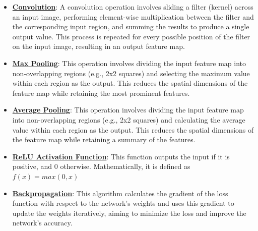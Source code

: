 \documentclass{article}%
\begin{document}
\begin{itemize}[leftmargin=*]%
\item \href{https://purdue.brightspace.com/d2l/common/assets/pdfjs-d2l-dist/1.0.14-legacy/web/viewer.html?file=%2Fcontent%2Fenforced%2F1095467-wl.202510.CS.24300.001%2F09L1-cnn.pdf%3Fou%3D1095467&lang=en-us&container=d2l-fileviewer-rendered-pdf&fullscreen=d2l-fileviewer-rendered-pdf-dialog&height=667#page=6}{\textbf{Convolution}}: A convolution operation involves sliding a filter (kernel) across an input image, performing element-wise multiplication between the filter and the corresponding input region, and summing the results to produce a single output value. This process is repeated for every possible position of the filter on the input image, resulting in an output feature map.%
\item \href{https://purdue.brightspace.com/d2l/common/assets/pdfjs-d2l-dist/1.0.14-legacy/web/viewer.html?file=%2Fcontent%2Fenforced%2F1095467-wl.202510.CS.24300.001%2F09L1-cnn.pdf%3Fou%3D1095467&lang=en-us&container=d2l-fileviewer-rendered-pdf&fullscreen=d2l-fileviewer-rendered-pdf-dialog&height=667#page=14}{\textbf{Max Pooling}}: This operation involves dividing the input feature map into non-overlapping regions (e.g., 2x2 squares) and selecting the maximum value within each region as the output. This reduces the spatial dimensions of the feature map while retaining the most prominent features.%
\item \href{https://purdue.brightspace.com/d2l/common/assets/pdfjs-d2l-dist/1.0.14-legacy/web/viewer.html?file=%2Fcontent%2Fenforced%2F1095467-wl.202510.CS.24300.001%2F09L1-cnn.pdf%3Fou%3D1095467&lang=en-us&container=d2l-fileviewer-rendered-pdf&fullscreen=d2l-fileviewer-rendered-pdf-dialog&height=667#page=15}{\textbf{Average Pooling}}: This operation involves dividing the input feature map into non-overlapping regions (e.g., 2x2 squares) and calculating the average value within each region as the output. This reduces the spatial dimensions of the feature map while retaining a summary of the features.%
\item \href{https://purdue.brightspace.com/d2l/common/assets/pdfjs-d2l-dist/1.0.14-legacy/web/viewer.html?file=%2Fcontent%2Fenforced%2F1095467-wl.202510.CS.24300.001%2F09L1-cnn.pdf%3Fou%3D1095467&lang=en-us&container=d2l-fileviewer-rendered-pdf&fullscreen=d2l-fileviewer-rendered-pdf-dialog&height=667#page=13}{\textbf{ReLU Activation Function}}: This function outputs the input if it is positive, and 0 otherwise. Mathematically, it is defined as $f(x) = max(0, x)$%
\item \href{https://purdue.brightspace.com/d2l/common/assets/pdfjs-d2l-dist/1.0.14-legacy/web/viewer.html?file=%2Fcontent%2Fenforced%2F1095467-wl.202510.CS.24300.001%2F09L1-cnn.pdf%3Fou%3D1095467&lang=en-us&container=d2l-fileviewer-rendered-pdf&fullscreen=d2l-fileviewer-rendered-pdf-dialog&height=667#page=16}{\textbf{Backpropagation}}: This algorithm calculates the gradient of the loss function with respect to the network's weights and uses this gradient to update the weights iteratively, aiming to minimize the loss and improve the network's accuracy.%
\end{itemize}%
\end{document}
